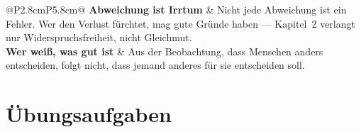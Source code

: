 \begin{warnung}
\begin{center}
{\small
\renewcommand{\arraystretch}{1.52}
\begin{tabular}{@{}P{2.8cm}P{5.8cm}@{}}
\toprule
\textbf{Abweichung ist Irrtum} & Nicht jede Abweichung ist ein Fehler. Wer den Verlust fürchtet, mag gute Gründe haben --- Kapitel~2 verlangt nur Widerspruchsfreiheit, nicht Gleichmut.\\
\textbf{Wer weiß, was gut ist} & Aus der Beobachtung, dass Menschen anders entscheiden, folgt nicht, dass jemand anderes für sie entscheiden soll.\\
\bottomrule
\end{tabular}}
\end{center}

\begin{center}
\begin{minipage}{0.88\textwidth}
\end{minipage}
\end{center}
\end{warnung}

\section{Übungsaufgaben}

